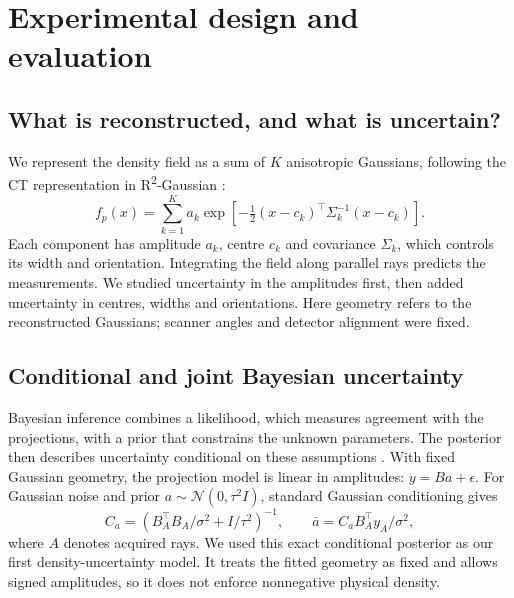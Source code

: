 \documentclass[11pt,a4paper]{article}
\newcommand{\Rtwo}{R\textsuperscript{2}-Gaussian}
\begin{document}
\section{Experimental design and evaluation}
\subsection{What is reconstructed, and what is uncertain?}
We represent the density field as a sum of $K$ anisotropic Gaussians, following the CT representation in \Rtwo{} \cite{r2}:
\begin{equation}
f_p(x)=\sum_{k=1}^K a_k\exp\!\left[-\tfrac12(x-c_k)^\top\Sigma_k^{-1}(x-c_k)\right].
\end{equation}
Each component has amplitude $a_k$, centre $c_k$ and covariance $\Sigma_k$, which controls its width and orientation. Integrating the field along parallel rays predicts the measurements. We studied uncertainty in the amplitudes first, then added uncertainty in centres, widths and orientations. Here geometry refers to the reconstructed Gaussians; scanner angles and detector alignment were fixed.

\subsection{Conditional and joint Bayesian uncertainty}
Bayesian inference combines a likelihood, which measures agreement with the projections, with a prior that constrains the unknown parameters. The posterior then describes uncertainty conditional on these assumptions \cite{rasmussen}. With fixed Gaussian geometry, the projection model is linear in amplitudes: $y=B a+\epsilon$. For Gaussian noise and prior $a\sim\mathcal N(0,\tau^2I)$, standard Gaussian conditioning gives \cite{rasmussen}
\begin{equation}
C_a=\left(B_A^\top B_A/\sigma^2+I/\tau^2\right)^{-1},\qquad
\bar a=C_a B_A^\top y_A/\sigma^2,\label{eq:linear}
\end{equation}
where $A$ denotes acquired rays. We used this exact conditional posterior as our first density-uncertainty model. It treats the fitted geometry as fixed and allows signed amplitudes, so it does not enforce nonnegative physical density.
\end{document}
